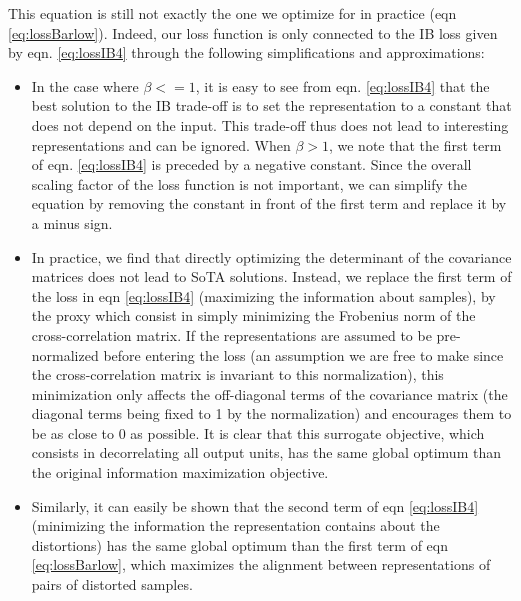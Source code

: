 This equation is still not exactly the one we optimize for in practice (eqn \ref{eq:lossBarlow}). Indeed, our loss function is only connected to the IB loss given by eqn. \ref{eq:lossIB4} through the following simplifications and approximations:
\begin{itemize}
  \item In the case where $\beta<=1$, it is easy to see from eqn. \ref{eq:lossIB4} that the best solution to the IB trade-off is to set the representation to a constant that does not depend on the input. This trade-off thus does not lead to interesting representations and can be ignored. When $\beta>1$, we note that the first term of eqn. \ref{eq:lossIB4} is preceded by a negative constant. Since the overall scaling factor of the loss function is not important, we can simplify the equation by removing the constant in front of the first term and replace it by a minus sign. 
  \item In practice, we find that directly optimizing the determinant of the covariance matrices does not lead to SoTA solutions. Instead, we replace the first term of the loss in eqn \ref{eq:lossIB4} (maximizing the information about samples), by the proxy which consist in simply minimizing the Frobenius norm of the cross-correlation matrix. If the representations are assumed to be pre-normalized before entering the loss (an assumption we are free to make since the cross-correlation matrix is invariant to this normalization), this minimization only affects the off-diagonal terms of the covariance matrix
  (the diagonal terms being fixed to 1 by the normalization) and encourages them to be as close to 0 as possible. It is clear that this surrogate objective, which consists in decorrelating all output units, has the same global optimum than the original information maximization objective. 
  \item Similarly, it can easily be shown that the second term of eqn \ref{eq:lossIB4} (minimizing the information the representation contains about the distortions) has the same global optimum than the first term of eqn \ref{eq:lossBarlow}, which maximizes the alignment between representations of pairs of distorted samples.  
\end{itemize}



